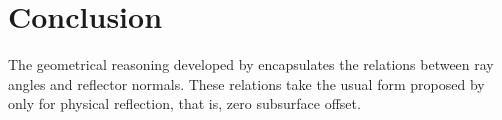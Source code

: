 \section{Conclusion}
The geometrical reasoning developed by \cite{HouSymes:15} encapsulates the relations between ray angles and reflector normals. These relations take the usual form proposed by \cite{SavaFomel:03} only for physical reflection, that is, zero subsurface offset.








